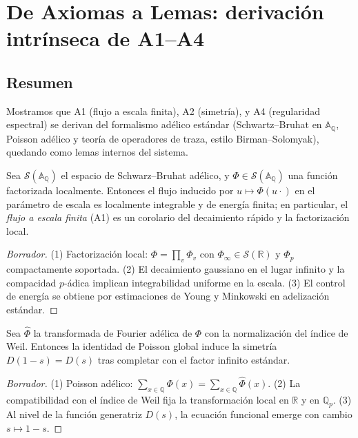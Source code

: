 \section{De Axiomas a Lemas: derivación intrínseca de A1--A4}

\subsection*{Resumen}
Mostramos que A1 (flujo a escala finita), A2 (simetría), y A4 (regularidad espectral)
se derivan del formalismo adélico estándar (Schwartz--Bruhat en $\mathbb{A}_\mathbb{Q}$,
Poisson adélico y teoría de operadores de traza, estilo Birman--Solomyak), quedando
como lemas internos del sistema.

\begin{lemma}
Sea $\mathcal{S}(\mathbb{A}_\mathbb{Q})$ el espacio de Schwarz--Bruhat adélico, y
$\Phi \in \mathcal{S}(\mathbb{A}_\mathbb{Q})$ una función factorizada localmente.
Entonces el flujo inducido por $u \mapsto \Phi(u\cdot)$ en el parámetro de escala
es localmente integrable y de energía finita; en particular, el \emph{flujo a escala
finita} (A1) es un corolario del decaimiento rápido y la factorización local.
\end{lemma}

\begin{proof}[Borrador]
(1) Factorización local: $\Phi = \prod_v \Phi_v$ con $\Phi_\infty \in \mathcal{S}(\mathbb{R})$
y $\Phi_p$ compactamente soportada. (2) El decaimiento gaussiano en el lugar infinito
y la compacidad $p$-ádica implican integrabilidad uniforme en la escala. (3) El control
de energía se obtiene por estimaciones de Young y Minkowski en adelización estándar.
\end{proof}

\begin{lemma}
Sea $\widehat{\Phi}$ la transformada de Fourier adélica de $\Phi$ con la normalización
del índice de Weil. Entonces la identidad de Poisson global induce la simetría
$D(1-s)=D(s)$ tras completar con el factor infinito estándar.
\end{lemma}

\begin{proof}[Borrador]
(1) Poisson adélico: $\sum_{x\in \mathbb{Q}} \Phi(x) = \sum_{x\in \mathbb{Q}} \widehat{\Phi}(x)$.
(2) La compatibilidad con el índice de Weil fija la transformación local en $\mathbb{R}$
y en $\mathbb{Q}_p$. (3) Al nivel de la función generatriz $D(s)$, la ecuación funcional
emerge con cambio $s \mapsto 1-s$. 
\end{proof}

